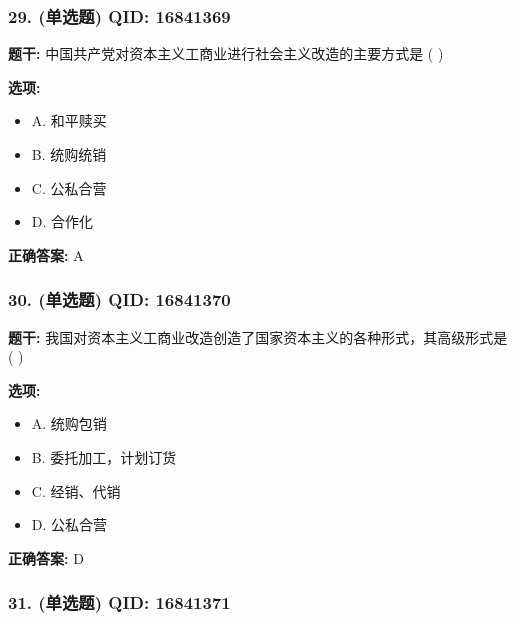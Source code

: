 \documentclass[12pt,UTF8]{ctexart}
\begin{document}
\subsubsection*{29. (单选题) \small QID: 16841369}

\textbf{题干:}
中国共产党对资本主义工商业进行社会主义改造的主要方式是 ( )

\textbf{选项:}
\begin{itemize}[leftmargin=*]

  \item A. 和平赎买

  \item B. 统购统销

  \item C. 公私合营

  \item D. 合作化

\end{itemize}

\textbf{正确答案:}
A

\vspace{0.3em}\hrulefill\vspace{0.7em}

\subsubsection*{30. (单选题) \small QID: 16841370}

\textbf{题干:}
我国对资本主义工商业改造创造了国家资本主义的各种形式，其高级形式是 ( )

\textbf{选项:}
\begin{itemize}[leftmargin=*]

  \item A. 统购包销

  \item B. 委托加工，计划订货

  \item C. 经销、代销

  \item D. 公私合营

\end{itemize}

\textbf{正确答案:}
D

\vspace{0.3em}\hrulefill\vspace{0.7em}

\subsubsection*{31. (单选题) \small QID: 16841371}
\end{document}
